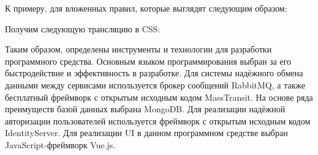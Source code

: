 К примеру, для вложенных правил, которые выглядят следующим образом:



Получим следующую трансляцию в CSS:



Таким образом, определены инструменты и технологии для разработки программного средства. Основным языком программирования выбран \csharp за его быстродействие и эффективность в разработке. Для системы надёжного обмена данными между сервисами используется брокер сообщений RabbitMQ, а также бесплатный фреймворк с открытым исходным кодом MassTransit. На основе ряда преимуществ базой данных выбрана MongoDB. Для реализации надёжной авторизации пользователей используется фреймворк с открытым исходным кодом IdentityServer. Для реализации UI в данном программном средстве выбран JavaScript-фреймворк Vue.js.
